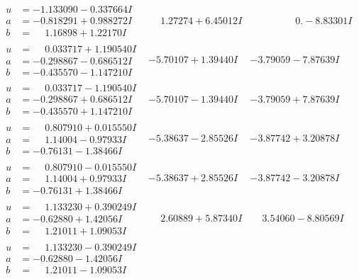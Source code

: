 \documentclass[1p]{elsarticle_modified}
\theoremstyle{definition}
\begin{document}
$$\begin{array}{c|c|c}
\begin{aligned}
u &= -1.133090 - 0.337664 I \\
a &= -0.818291 + 0.988272 I \\
b &= \phantom{-}1.16898 + 1.22170 I\end{aligned}
 & \phantom{-}1.27274 + 6.45012 I & \phantom{-0.000000 } 0. - 8.83301 I \\ \hline\begin{aligned}
u &= \phantom{-}0.033717 + 1.190540 I \\
a &= -0.298867 - 0.686512 I \\
b &= -0.435570 - 1.147210 I\end{aligned}
 & -5.70107 + 1.39440 I & -3.79059 - 7.87639 I \\ \hline\begin{aligned}
u &= \phantom{-}0.033717 - 1.190540 I \\
a &= -0.298867 + 0.686512 I \\
b &= -0.435570 + 1.147210 I\end{aligned}
 & -5.70107 - 1.39440 I & -3.79059 + 7.87639 I \\ \hline\begin{aligned}
u &= \phantom{-}0.807910 + 0.015550 I \\
a &= \phantom{-}1.14004 - 0.97933 I \\
b &= -0.76131 - 1.38466 I\end{aligned}
 & -5.38637 - 2.85526 I & -3.87742 + 3.20878 I \\ \hline\begin{aligned}
u &= \phantom{-}0.807910 - 0.015550 I \\
a &= \phantom{-}1.14004 + 0.97933 I \\
b &= -0.76131 + 1.38466 I\end{aligned}
 & -5.38637 + 2.85526 I & -3.87742 - 3.20878 I \\ \hline\begin{aligned}
u &= \phantom{-}1.133230 + 0.390249 I \\
a &= -0.62880 + 1.42056 I \\
b &= \phantom{-}1.21011 + 1.09053 I\end{aligned}
 & \phantom{-}2.60889 + 5.87340 I & \phantom{-}3.54060 - 8.80569 I \\ \hline\begin{aligned}
u &= \phantom{-}1.133230 - 0.390249 I \\
a &= -0.62880 - 1.42056 I \\
b &= \phantom{-}1.21011 - 1.09053 I\end{aligned}

\end{array}$$
\end{document}
